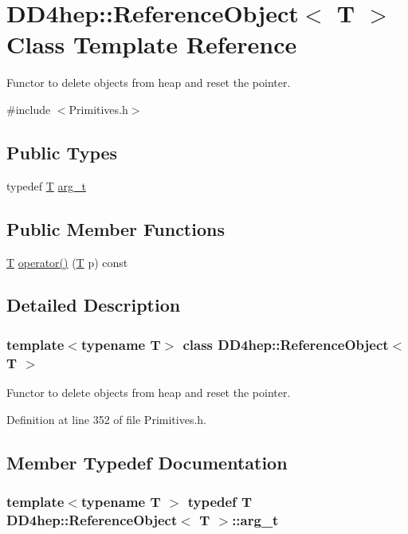 \hypertarget{class_d_d4hep_1_1_reference_object}{
\section{DD4hep::ReferenceObject$<$ T $>$ Class Template Reference}
\label{class_d_d4hep_1_1_reference_object}
}


Functor to delete objects from heap and reset the pointer.  


{\ttfamily \#include $<$Primitives.h$>$}\subsection*{Public Types}
\begin{DoxyCompactItemize}
\item 
typedef \hyperlink{class_t}{T} \hyperlink{class_d_d4hep_1_1_reference_object_a7a8218bed56da484060ab742e31b46a9}{arg\_\-t}
\end{DoxyCompactItemize}
\subsection*{Public Member Functions}
\begin{DoxyCompactItemize}
\item 
\hyperlink{class_t}{T} \hyperlink{class_d_d4hep_1_1_reference_object_a45b2c18d77ae70b4e23d7e24db3aefb5}{operator()} (\hyperlink{class_t}{T} p) const 
\end{DoxyCompactItemize}


\subsection{Detailed Description}
\subsubsection*{template$<$typename T$>$ class DD4hep::ReferenceObject$<$ T $>$}

Functor to delete objects from heap and reset the pointer. 

Definition at line 352 of file Primitives.h.

\subsection{Member Typedef Documentation}
\hypertarget{class_d_d4hep_1_1_reference_object_a7a8218bed56da484060ab742e31b46a9}{
\subsubsection[{arg\_\-t}]{\setlength{\rightskip}{0pt plus 5cm}template$<$typename T $>$ typedef {\bf T} {\bf DD4hep::ReferenceObject}$<$ {\bf T} $>$::{\bf arg\_\-t}}}
\label{class_d_d4hep_1_1_reference_object_a7a8218bed56da484060ab742e31b46a9}


